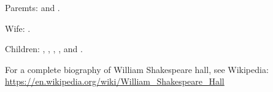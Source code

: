 
Paremts:  and .

Wife: .

Children:
,
,
,
,
and .

For a complete biography of William Shakespeare hall, see Wikipedia: \\
\url{https://en.wikipedia.org/wiki/William_Shakespeare_Hall}
